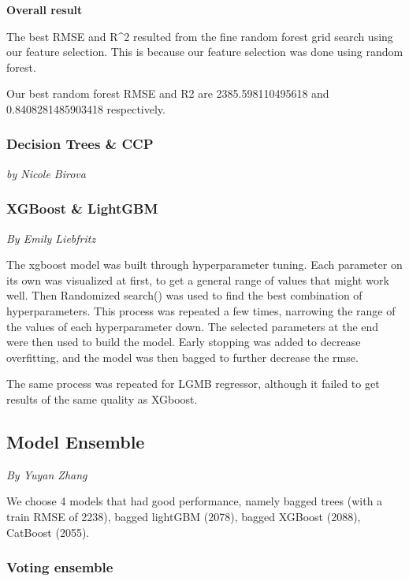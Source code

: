 \documentclass[
  letterpaper,
  DIV=11,
  numbers=noendperiod]{scrartcl}
\begin{document}
\textbf{Overall result}

The best RMSE and R\^{}2 resulted from the fine random forest grid
search using our feature selection. This is because our feature
selection was done using random forest.

Our best random forest RMSE and R2 are 2385.598110495618 and
0.8408281485903418 respectively.

\hypertarget{decision-trees-ccp}{%
\subsubsection{Decision Trees \& CCP}\label{decision-trees-ccp}}

\emph{by Nicole Birova}

\hypertarget{xgboost-lightgbm}{%
\subsubsection{XGBoost \& LightGBM}\label{xgboost-lightgbm}}

\emph{By Emily Liebfritz}

The xgboost model was built through hyperparameter tuning. Each
parameter on its own was visualized at first, to get a general range of
values that might work well. Then Randomized search() was used to find
the best combination of hyperparameters. This process was repeated a few
times, narrowing the range of the values of each hyperparameter down.
The selected parameters at the end were then used to build the model.
Early stopping was added to decrease overfitting, and the model was then
bagged to further decrease the rmse.

The same process was repeated for LGMB regressor, although it failed to
get results of the same quality as XGboost.

\hypertarget{model-ensemble}{%
\subsection{Model Ensemble}\label{model-ensemble}}

\emph{By Yuyan Zhang}

We choose 4 models that had good performance, namely bagged trees (with
a train RMSE of 2238), bagged lightGBM (2078), bagged XGBoost (2088),
CatBoost (2055).

\hypertarget{voting-ensemble}{%
\subsubsection{Voting ensemble}\label{voting-ensemble}}
\end{document}
